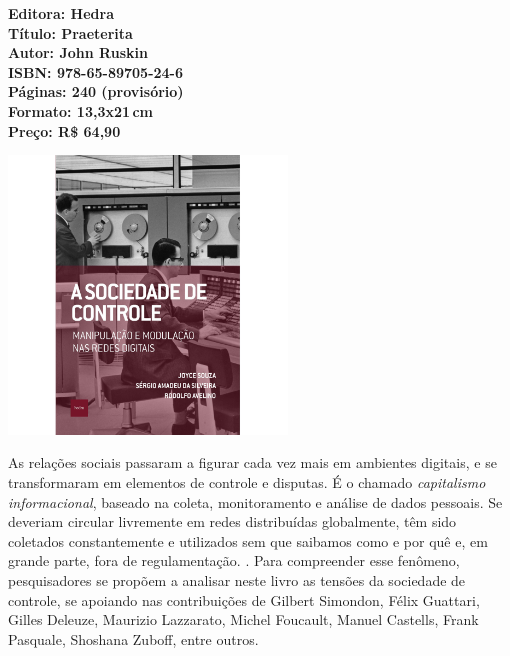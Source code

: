 \vfill
\noindent\begin{minipage}[c]{1\linewidth}
{\small\textbf{
\hspace*{-.1cm}Editora: Hedra\\
Título: Praeterita\\
Autor: John Ruskin\\ 
ISBN: 978-65-89705-24-6\\
Páginas: 240 (provisório)\\
Formato: 13,3x21\,cm\\
Preço: R\$ 64,90\\
}}
\end{minipage}
\pagebreak

\begin{center}
\hspace*{-3.6cm}
\hspace*{3.1cm}\includegraphics[width=74mm]{./CAPAS/HEDRA_SOCIEDADE.jpg}
\end{center}
\hspace*{-7cm}\hrulefill\hspace*{-7cm}
\medskip

\noindent{}As relações sociais passaram a figurar cada vez mais em ambientes digitais, e se transformaram em elementos de controle e disputas. É o chamado \textit{capitalismo informacional}, baseado na coleta, monitoramento e análise de dados pessoais. Se deveriam circular livremente em redes distribuídas globalmente, têm sido coletados constantemente e utilizados sem que saibamos como e por quê e, em grande parte, fora de regulamentação. . Para compreender esse fenômeno, pesquisadores se propõem a analisar neste livro as tensões da sociedade de controle, se apoiando nas contribuições de Gilbert Simondon, Félix Guattari, Gilles Deleuze, Maurizio Lazzarato, Michel Foucault, Manuel Castells, Frank Pasquale, Shoshana Zuboff, entre outros.

